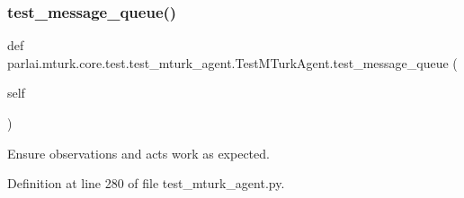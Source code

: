 \subsubsection{\texorpdfstring{test\+\_\+message\+\_\+queue()}{test\_message\_queue()}}
{\footnotesize\ttfamily def parlai.\+mturk.\+core.\+test.\+test\+\_\+mturk\+\_\+agent.\+Test\+M\+Turk\+Agent.\+test\+\_\+message\+\_\+queue (\begin{DoxyParamCaption}\item[{}]{self }\end{DoxyParamCaption})}

\begin{DoxyVerb}Ensure observations and acts work as expected.
\end{DoxyVerb}
 

Definition at line 280 of file test\+\_\+mturk\+\_\+agent.\+py.


